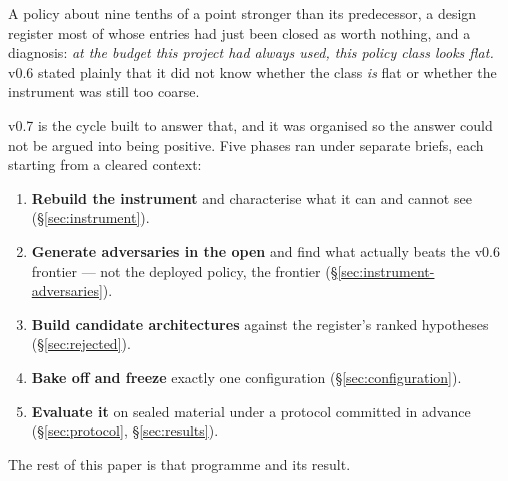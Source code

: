 A policy about nine tenths of a point stronger than its predecessor, a design register most of whose
entries had just been closed as worth nothing, and a diagnosis: \emph{at the budget this project had
always used, this policy class looks flat.} v0.6 stated plainly that it did not know whether the
class \emph{is} flat or whether the instrument was still too coarse.

v0.7 is the cycle built to answer that, and it was organised so the answer could not be argued into
being positive. Five phases ran under separate briefs, each starting from a cleared context:

\begin{enumerate}
\item \textbf{Rebuild the instrument} and characterise what it can and cannot see
      (\S\ref{sec:instrument}).
\item \textbf{Generate adversaries in the open} and find what actually beats the v0.6 frontier ---
      not the deployed policy, the frontier (\S\ref{sec:instrument-adversaries}).
\item \textbf{Build candidate architectures} against the register's ranked hypotheses
      (\S\ref{sec:rejected}).
\item \textbf{Bake off and freeze} exactly one configuration (\S\ref{sec:configuration}).
\item \textbf{Evaluate it} on sealed material under a protocol committed in advance
      (\S\ref{sec:protocol}, \S\ref{sec:results}).
\end{enumerate}

The rest of this paper is that programme and its result.
